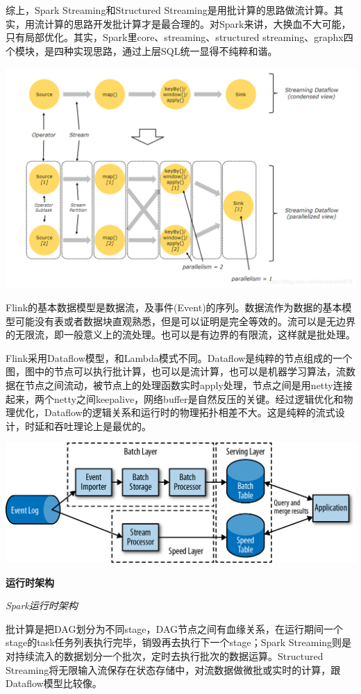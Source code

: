 \documentclass[oneside]{ctexbook}
\begin{document}
综上，Spark Streaming和Structured Streaming是用批计算的思路做流计算。其实，用流计算的思路开发批计算才是最合理的。对Spark来讲，大换血不大可能，只有局部优化。其实，Spark里core、streaming、structured streaming、graphx四个模块，是四种实现思路，通过上层SQL统一显得不纯粹和谐。

\noindent \includegraphics[width=\textwidth]{shujumoxing2.png}

Flink的基本数据模型是数据流，及事件(Event)的序列。数据流作为数据的基本模型可能没有表或者数据块直观熟悉，但是可以证明是完全等效的。流可以是无边界的无限流，即一般意义上的流处理。也可以是有边界的有限流，这样就是批处理。

Flink采用Dataflow模型，和Lambda模式不同。Dataflow是纯粹的节点组成的一个图，图中的节点可以执行批计算，也可以是流计算，也可以是机器学习算法，流数据在节点之间流动，被节点上的处理函数实时apply处理，节点之间是用netty连接起来，两个netty之间keepalive，网络buffer是自然反压的关键。经过逻辑优化和物理优化，Dataflow的逻辑关系和运行时的物理拓扑相差不大。这是纯粹的流式设计，时延和吞吐理论上是最优的。

\noindent \includegraphics[width=\textwidth]{lambdaarch.png}

\textbf{运行时架构}

\textit{Spark运行时架构}

批计算是把DAG划分为不同stage，DAG节点之间有血缘关系，在运行期间一个stage的task任务列表执行完毕，销毁再去执行下一个stage；Spark Streaming则是对持续流入的数据划分一个批次，定时去执行批次的数据运算。Structured Streaming将无限输入流保存在状态存储中，对流数据做微批或实时的计算，跟Dataflow模型比较像。
\end{document}

